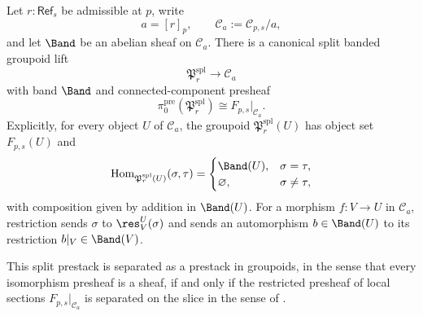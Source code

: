 \begin{proposition}\label{prop:split-banded-groupoid-lift}
Let $r:\mathsf{Ref}_s$ be admissible at $p$, write
\[
a=[r]_p,\qquad \mathcal C_a:=\mathcal C_{p,s}/a,
\]
and let $\Band$ be an abelian sheaf on $\mathcal C_a$. There is a canonical split banded groupoid lift
\[
\mathfrak P_r^{\mathrm{spl}}\to\mathcal C_a
\]
with band $\Band$ and connected-component presheaf
\[
\pi_0^{\mathrm{pre}}(\mathfrak P_r^{\mathrm{spl}})
\cong F_{p,s}|_{\mathcal C_a}.
\]
Explicitly, for every object $U$ of $\mathcal C_a$, the groupoid
$\mathfrak P_r^{\mathrm{spl}}(U)$ has object set $F_{p,s}(U)$ and
\[
\operatorname{Hom}_{\mathfrak P_r^{\mathrm{spl}}(U)}(\sigma,\tau)=
\begin{cases}
\Band(U),& \sigma=\tau,\\
\varnothing,& \sigma\ne\tau,
\end{cases}
\]
with composition given by addition in $\Band(U)$. For a morphism
$f:V\to U$ in $\mathcal C_a$, restriction sends $\sigma$ to
$\res_V^U(\sigma)$ and sends an automorphism $b\in\Band(U)$ to its
restriction $b|_V\in\Band(V)$.

This split prestack is separated as a prestack in groupoids, in the
sense that every isomorphism presheaf is a sheaf, if and only if the
restricted presheaf of local sections $F_{p,s}|_{\mathcal C_a}$ is
separated on the slice in the sense of .
\end{proposition}

